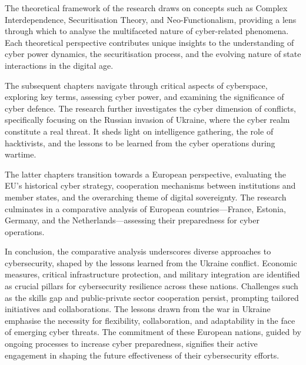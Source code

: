 The theoretical framework of the research draws on concepts such as Complex Interdependence, Securitisation Theory, and Neo-Functionalism, providing a lens through which to analyse the multifaceted nature of cyber-related phenomena. Each theoretical perspective contributes unique insights to the understanding of cyber power dynamics, the securitisation process, and the evolving nature of state interactions in the digital age.

The subsequent chapters navigate through critical aspects of cyberspace, exploring key terms, assessing cyber power, and examining the significance of cyber defence. The research further investigates the cyber dimension of conflicts, specifically focusing on the Russian invasion of Ukraine, where the cyber realm constitute a real threat. It sheds light on intelligence gathering, the role of hacktivists, and the lessons to be learned from the cyber operations during wartime.

The latter chapters transition towards a European perspective, evaluating the EU's historical cyber strategy, cooperation mechanisms between institutions and member states, and the overarching theme of digital sovereignty. The research culminates in a comparative analysis of European countries—France, Estonia, Germany, and the Netherlands—assessing their preparedness for cyber operations.

In conclusion, the comparative analysis underscores diverse approaches to cybersecurity, shaped by the lessons learned from the Ukraine conflict. Economic measures, critical infrastructure protection, and military integration are identified as crucial pillars for cybersecurity resilience across these nations. Challenges such as the skills gap and public-private sector cooperation persist, prompting tailored initiatives and collaborations. The lessons drawn from the war in Ukraine emphasise the necessity for flexibility, collaboration, and adaptability in the face of emerging cyber threats. The commitment of these European nations, guided by ongoing processes to increase cyber preparedness, signifies their active engagement in shaping the future effectiveness of their cybersecurity efforts. 